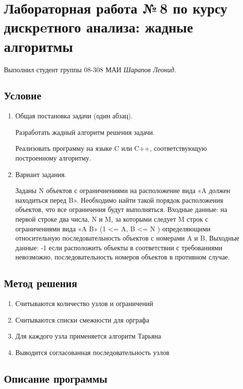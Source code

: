 \documentclass[12pt]{article}
\begin{document}
\section*{Лабораторная работа №\,8 по курсу дискрeтного анализа: жадные алгоритмы}

Выполнил студент группы 08-308 МАИ \textit{Шарапов Леонид}.

\subsection*{Условие}

\begin{enumerate}
\item Общая постановка задачи (один абзац).

Разработать жадный алгоритм решения задачи.

Реализовать программу на языке C или C++, соответствующую построенному алгоритму.

\item Вариант задания. 

Заданы N объектов с ограничиениями на расположение вида «A должен находиться перед B». Необходимо найти такой порядок расположения объектов, что все ограничения будут выполняться. Входные данные: на первой строке два числа, N и M, за которыми следует M строк с ограничениями вида «A B» (1 <= A, B <= N ) определяющими относительную последовательность объектов с номерами A и B. Выходные данные: -1 если расположить объекты в соответствии с требованиями невозможно, последовательность номеров объектов в противном случае.

\end{enumerate}

\subsection*{Метод решения}

\begin{enumerate}
\item Считываются количество узлов и ограничений
\item Считываются списки смежности для орграфа
\item Для каждого узла применяется алгоритм Тарьяна
\item Выводится согласованная последовательность узлов
\end{enumerate}

\subsection*{Описание программы}
\end{document}
